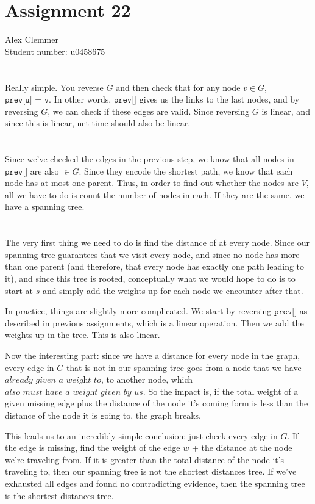 \documentclass[a4paper]{article}
\begin{document}
\section*{Assignment 22}
Alex Clemmer\\
Student number: u0458675

\section{}

Really simple. You reverse $G$ and then check that for any node $v \in G$, $\texttt{prev[u] = v}$. In other words, $\texttt{prev[]}$ gives us the links to the last nodes, and by reversing $G$, we can check if these edges are valid. Since reversing $G$ is linear, and since this is linear, net time should also be linear.

\section{}

Since we've checked the edges in the previous step, we know that all nodes in $\texttt{prev[]}$ are also $\in G$. Since they encode the shortest path, we know that each node has at most one parent. Thus, in order to find out whether the nodes are $V$, all we have to do is count the number of nodes in each. If they are the same, we have a spanning tree.

\section{}

The very first thing we need to do is find the distance of at every node. Since our spanning tree guarantees that we visit every node, and since no node has more than one parent (and therefore, that every node has exactly one path leading to it), and since this tree is rooted, conceptually what we would hope to do is to start at $s$ and simply add the weights up for each node we encounter after that.

In practice, things are slightly more complicated. We start by reversing $\texttt{prev[]}$ as described in previous assignments, which is a linear operation. Then we add the weights up in the tree. This is also linear.

Now the interesting part: since we have a distance for every node in the graph, every edge in $G$ that is not in our spanning tree goes from a node that we have $\textit{already given a weight to}$, to another node, which $\textit{also must have a weight given by us}$. So the impact is, if the total weight of a given missing edge plus the distance of the node it's coming form is less than the distance of the node it is going to, the graph breaks.

This leads us to an incredibly simple conclusion: just check every edge in $G$. If the edge is missing, find the weight of the edge $w$ + the distance at the node we're traveling from. If it is greater than the total distance of the node it's traveling to, then our spanning tree is not the shortest distances tree. If we've exhausted all edges and found no contradicting evidence, then the spanning tree is the shortest distances tree.
\end{document}
